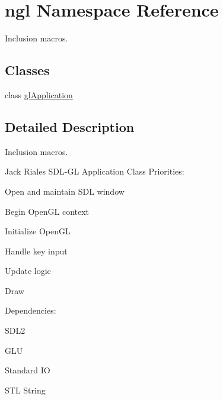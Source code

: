 \hypertarget{namespacengl}{}\section{ngl Namespace Reference}
\label{namespacengl}


Inclusion macros.  


\subsection*{Classes}
\begin{DoxyCompactItemize}
\item 
class \hyperlink{classngl_1_1gl_application}{gl\+Application}
\end{DoxyCompactItemize}


\subsection{Detailed Description}
Inclusion macros. 

Jack Riales S\+D\+L-\/\+G\+L Application Class Priorities\+:
\begin{DoxyItemize}
\item Open and maintain S\+D\+L window
\item Begin Open\+G\+L context
\item Initialize Open\+G\+L
\item Handle key input
\item Update logic
\item Draw
\end{DoxyItemize}

Dependencies\+:
\begin{DoxyItemize}
\item S\+D\+L2
\item G\+L\+U
\item Standard I\+O
\item S\+T\+L String 
\end{DoxyItemize}